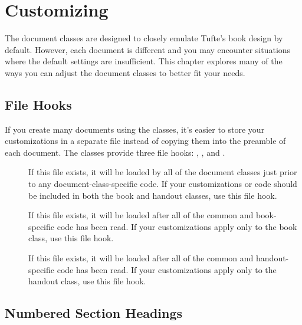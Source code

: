 


\chapter[Customizing Tufte-LaTeX]{Customizing \TL}
\label{ch:customizing}

The \TL document classes are designed to closely emulate Tufte's book
design by default.  However, each document is different and you may encounter
situations where the default settings are insufficient.  This chapter explores
many of the ways you can adjust the \TL document classes to better fit
your needs.

\section{File Hooks}
\label{sec:filehooks}

If you create many documents using the \TL classes, it's easier to
store your customizations in a separate file instead of copying them into the
preamble of each document.  The \TL classes provide three file hooks:
, , and
.\sloppy

\begin{description}
  \item[]
    If this file exists, it will be loaded by all of the \TL document
    classes just prior to any document-class-specific code.  If your
    customizations or code should be included in both the book and handout
    classes, use this file hook.
  \item[] 
    If this file exists, it will be loaded after all of the common and
    book-specific code has been read.  If your customizations apply only to the
    book class, use this file hook.
  \item[] 
    If this file exists, it will be loaded after all of the common and
    handout-specific code has been read.  If your customizations apply only to
    the handout class, use this file hook.
\end{description}


\section{Numbered Section Headings}
\label{sec:numbered-sections}

